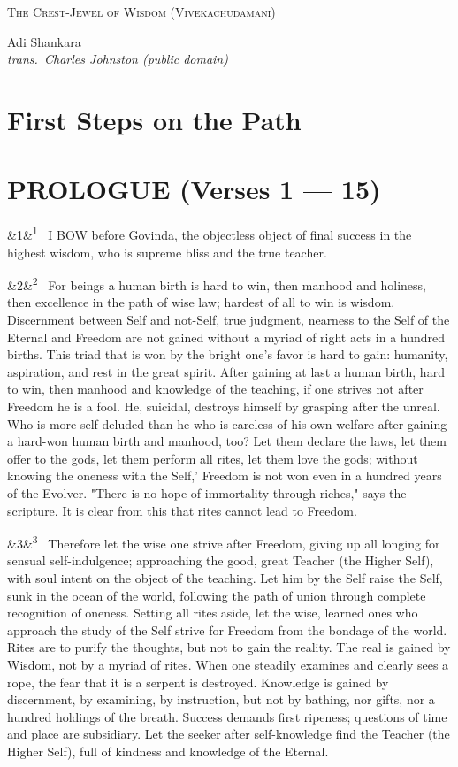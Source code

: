 \documentclass[12pt]{article}
\newcommand{\work}[1]{\begin{center}\LARGE\scshape #1\end{center}}
\newcommand{\attrib}[2]{\begin{center}\large #1\\[2pt]\small\itshape trans.\ #2\end{center}\vspace{1em}}
\newcommand{\para}[1][]{\par\noindent\ifx&#1&\else\textsuperscript{\footnotesize #1}~\fi}
\begin{document}
\work{The Crest-Jewel of Wisdom (Vivekachudamani)}
\attrib{Adi Shankara}{Charles Johnston (public domain)}

\section*{First Steps on the Path}

\section*{PROLOGUE (Verses 1 --- 15)}

\para[1] I BOW before Govinda, the objectless object of final success in the highest wisdom, who is supreme bliss and the true teacher.

\para[2] For beings a human birth is hard to win, then manhood and holiness, then excellence in the path of wise law; hardest of all to win is wisdom. Discernment between Self and not-Self, true judgment, nearness to the Self of the Eternal and Freedom are not gained without a myriad of right acts in a hundred births. This triad that is won by the bright one's favor is hard to gain: humanity, aspiration, and rest in the great spirit. After gaining at last a human birth, hard to win, then manhood and knowledge of the teaching, if one strives not after Freedom he is a fool. He, suicidal, destroys himself by grasping after the unreal. Who is more self-deluded than he who is careless of his own welfare after gaining a hard-won human birth and manhood, too? Let them declare the laws, let them offer to the gods, let them perform all rites, let them love the gods; without knowing the oneness with the Self,' Freedom is not won even in a hundred years of the Evolver. "There is no hope of immortality through riches," says the scripture. It is clear from this that rites cannot lead to Freedom.

\para[3] Therefore let the wise one strive after Freedom, giving up all longing for sensual self-indulgence; approaching the good, great Teacher (the Higher Self), with soul intent on the object of the teaching. Let him by the Self raise the Self, sunk in the ocean of the world, following the path of union through complete recognition of oneness. Setting all rites aside, let the wise, learned ones who approach the study of the Self strive for Freedom from the bondage of the world. Rites are to purify the thoughts, but not to gain the reality. The real is gained by Wisdom, not by a myriad of rites. When one steadily examines and clearly sees a rope, the fear that it is a serpent is destroyed. Knowledge is gained by discernment, by examining, by instruction, but not by bathing, nor gifts, nor a hundred holdings of the breath. Success demands first ripeness; questions of time and place are subsidiary. Let the seeker after self-knowledge find the Teacher (the Higher Self), full of kindness and knowledge of the Eternal.
\end{document}

